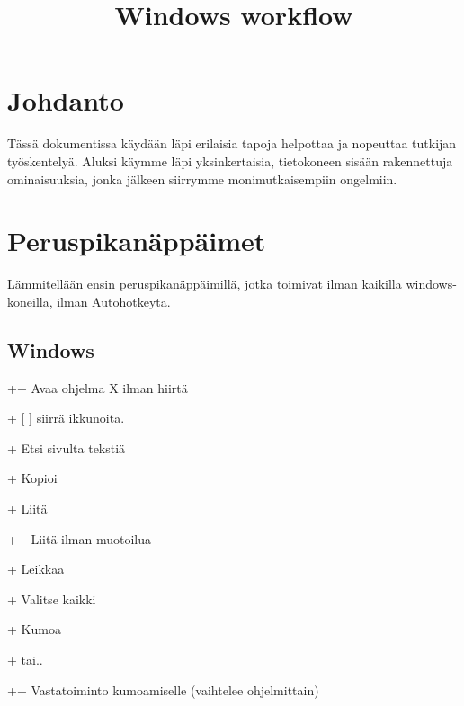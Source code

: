 \documentclass[a5paper,9pt]{scrartcl}
\title{Windows workflow}
\begin{document}
	
	\maketitle
	
	\tableofcontents
	
	\newpage
	
    \section{Johdanto}\label{Johdanto}
    Tässä dokumentissa käydään läpi erilaisia tapoja helpottaa ja nopeuttaa tutkijan työskentelyä. Aluksi käymme läpi yksinkertaisia, tietokoneen sisään rakennettuja ominaisuuksia, jonka jälkeen siirrymme monimutkaisempiin ongelmiin.
    
    \section{Peruspikanäppäimet}
    \label{perus}
    
    Lämmitellään ensin peruspikanäppäimillä, jotka toimivat ilman kaikilla windows-koneilla, ilman Autohotkeyta.
    
    \subsection{Windows}
    
    
    \indent 
    
    ++\keys{\return} Avaa ohjelma X ilman hiirtä
    
    + [ \keys{\arrowkeyleft} \keys{\arrowkeyright} \keys{\arrowkeyup} \keys{\arrowkeydown} ] siirrä ikkunoita. 
    
    + Etsi sivulta tekstiä

    
    + Kopioi 
    
    + Liitä 
    
    +\keys{\shift}+ Liitä ilman muotoilua
    
    + Leikkaa 
    
    + Valitse kaikki
    
    + Kumoa
    
    + tai..
    
    ++  Vastatoiminto kumoamiselle (vaihtelee ohjelmittain)
    
\end{document}
